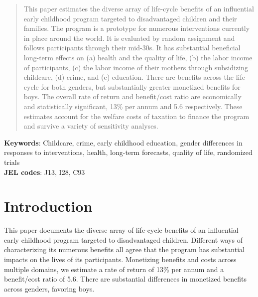 \singlespacing

\begin{abstract}
This paper estimates the diverse array of life-cycle benefits of an influential early childhood program targeted to disadvantaged children and their families. The program is a prototype for numerous interventions currently in place around the world. It is evaluated by random assignment and follows participants through their mid-30s. It has substantial beneficial long-term effects on (a) health and the quality of life, (b) the labor income of participants, (c) the labor income of their mothers through subsidizing childcare, (d) crime, and (e) education. There are benefits across the life cycle for both genders, but substantially greater monetized benefits for boys. The overall rate of return and benefit/cost ratio are economically and statistically significant, 13\% per annum and 5.6 respectively. These estimates account for the welfare costs of taxation to finance the program and survive a variety of sensitivity analyses.
\end{abstract}

\noindent \textbf{Keywords}: Childcare, crime, early childhood education, gender differences in responses to interventions, health, long-term forecasts, quality of life, randomized trials \\
\noindent \textbf{JEL codes}: J13, I28, C93


\tableofcontents

\clearpage
\doublespacing

\setcounter{page}{0}

\section{Introduction}

This paper documents the diverse array of life-cycle benefits of an influential early childhood program targeted to disadvantaged children. Different ways of characterizing its numerous benefits all agree that the program has substantial impacts on the lives of its participants. Monetizing benefits and costs across multiple domains, we estimate a rate of return of 13\% per annum and a benefit/cost ratio of 5.6. There are substantial differences in monetized benefits across genders, favoring boys.

